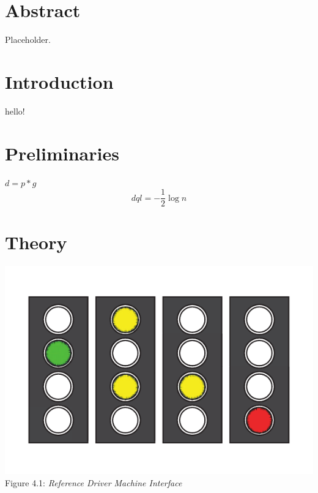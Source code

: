 \documentclass[twoside,12pt,a4paper]{article}
\begin{document}
\clearpage
\maketitle
\vspace{-5.5em}
\begingroup
\fontsize{9pt}{11pt}\selectfont
\tableofcontents
\endgroup
\clearpage
{}

\section{Abstract}
Placeholder.

\section{Introduction}
hello! \citep{RailExecutive14a}

\section{Preliminaries}
$ d = p * g $
\[ dql = - \frac{1}{2} \log n \]

\section{Theory}
\begin{center}
    \includegraphics[scale=.25]{Signals-eps-converted-to.pdf}\\
    Figure 4.1: \textit{Reference Driver Machine Interface \citep{RailExecutive14a}}
\end{center}
\end{document}
